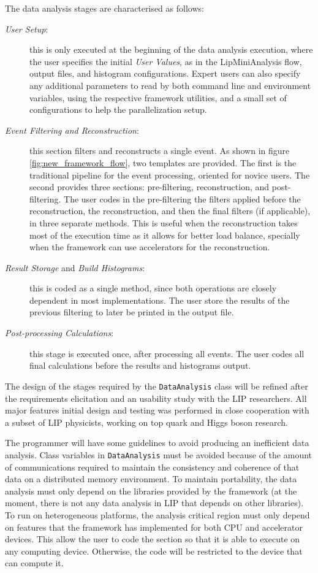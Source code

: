 The data analysis stages are characterised as follows:

\begin{description}
	\item[\textit{User Setup}:] this is only executed at the beginning of the data analysis execution, where the user specifies the initial \textit{User Values}, as in the LipMiniAnalysis flow, output files, and histogram configurations. Expert users can also specify any additional parameters to read by both command line and environment variables, using the respective framework utilities, and a small set of configurations to help the parallelization setup.
	\item[\textit{Event Filtering and Reconstruction}:] this section filters and reconstructs a single event. As shown in figure \ref{fig:new_framework_flow}, two templates are provided. The first is the traditional pipeline for the event processing, oriented for novice users. The second provides three sections: pre-filtering, reconstruction, and post-filtering. The user codes in the pre-filtering the filters applied before the reconstruction, the reconstruction, and then the final filters (if applicable), in three separate methods. This is useful when the reconstruction takes most of the execution time as it allows for better load balance, specially when the framework can use accelerators for the reconstruction.
	\item[\textit{Result Storage} and \textit{Build Histograms}:] this is coded as a single method, since both operations are closely dependent in most implementations. The user store the results of the previous filtering to later be printed in the output file.
	\item[\textit{Post-processing Calculations}:] this stage is executed once, after processing all events. The user codes all final calculations before the results and histograms output.
\end{description}

The design of the stages required by the \texttt{DataAnalysis} class will be refined after the requirements elicitation and an usability study with the LIP researchers. All major features initial design and testing was performed in close cooperation with a subset of LIP physicists, working on top quark and Higgs boson research.

The programmer will have some guidelines to avoid producing an inefficient data analysis. Class variables in \texttt{DataAnalysis} must be avoided because of the amount of communications required to maintain the consistency and coherence of that data on a distributed memory environment. To maintain portability, the data analysis must only depend on the libraries provided by the framework (at the moment, there is not any data analysis in LIP that depends on other libraries). To run on heterogeneous platforms, the analysis critical region must only depend on features that the framework has implemented for both CPU and accelerator devices. This allow the user to code the section so that it is able to execute on any computing device. Otherwise, the code will be restricted to the device that can compute it.

